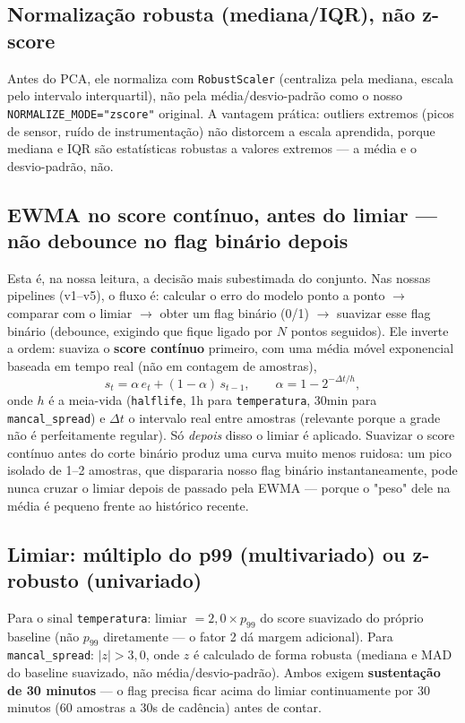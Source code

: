 \documentclass[11pt,a4paper]{article}
\begin{document}
\subsection{Normalização robusta (mediana/IQR), não z-score}

Antes do PCA, ele normaliza com \texttt{RobustScaler} (centraliza pela
mediana, escala pelo intervalo interquartil), não pela média/desvio-padrão
como o nosso \texttt{NORMALIZE\_MODE="zscore"} original. A vantagem prática:
outliers extremos (picos de sensor, ruído de instrumentação) não distorcem
a escala aprendida, porque mediana e IQR são estatísticas robustas a
valores extremos --- a média e o desvio-padrão, não.

\subsection{EWMA no score contínuo, antes do limiar --- não debounce no
flag binário depois}
\label{sec:ewma}

Esta é, na nossa leitura, a decisão mais subestimada do conjunto. Nas
nossas pipelines (v1--v5), o fluxo é: calcular o erro do modelo ponto a
ponto $\to$ comparar com o limiar $\to$ obter um flag binário (0/1)
$\to$ suavizar esse flag binário (debounce, exigindo que fique ligado por
$N$ pontos seguidos). Ele inverte a ordem: suaviza o \textbf{score
contínuo} primeiro, com uma média móvel exponencial baseada em tempo
real (não em contagem de amostras),
\[
  s_t = \alpha \, e_t + (1-\alpha)\, s_{t-1}, \qquad
  \alpha = 1 - 2^{-\Delta t / h},
\]
onde $h$ é a meia-vida (\texttt{halflife}, 1h para \texttt{temperatura},
30min para \texttt{mancal\_spread}) e $\Delta t$ o intervalo real entre
amostras (relevante porque a grade não é perfeitamente regular). Só
\emph{depois} disso o limiar é aplicado. Suavizar o score contínuo antes
do corte binário produz uma curva muito menos ruidosa: um pico isolado de
1--2 amostras, que dispararia nosso flag binário instantaneamente, pode
nunca cruzar o limiar depois de passado pela EWMA --- porque o "peso"
dele na média é pequeno frente ao histórico recente.

\subsection{Limiar: múltiplo do p99 (multivariado) ou z-robusto
(univariado)}

Para o sinal \texttt{temperatura}: limiar $= 2{,}0 \times p_{99}$ do
score suavizado do próprio baseline (não $p_{99}$ diretamente --- o
fator 2 dá margem adicional). Para \texttt{mancal\_spread}: $|z| > 3{,}0$,
onde $z$ é calculado de forma robusta (mediana e MAD do baseline
suavizado, não média/desvio-padrão). Ambos exigem \textbf{sustentação de
30 minutos} --- o flag precisa ficar acima do limiar continuamente por
30 minutos (60 amostras a 30s de cadência) antes de contar.
\end{document}
